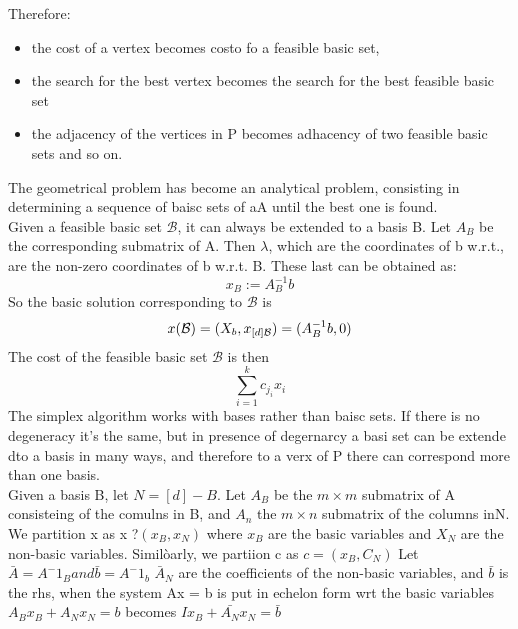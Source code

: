 Therefore:
\begin{itemize}
    \item the cost of a vertex becomes costo fo a feasible basic set,
    \item the search for the best vertex becomes the search for the best feasible basic set
    \item the adjacency of the vertices in P becomes adhacency of two feasible basic sets and so on. 
\end{itemize}
The geometrical problem has become an analytical problem, consisting in determining a sequence of baisc sets of aA until the best one is found.\\
Given a feasible basic set $ \mathcal{B} $, it can always be extended to a basis B. Let $A_B$ be the corresponding submatrix of A. Then $\lambda$, which are the coordinates of b w.r.t., are the non-zero coordinates of b w.r.t. B. These last can be obtained as: \[ 
    x_B := A_B^{-1}b 
\]
So the basic solution corresponding to $ \mathcal{B } $ is 
\[ 
    x(\mathcal{B}) = (X_b, x_{[d]\\ \mathcal{B}}) = (A^{-1}_Bb,0)
\]
The cost of the feasible basic set $ \mathcal{B} $ is then \[ 
    \sum_{i=1}^{k}{c_{j_i}x_i} 
\]
The simplex algorithm works with bases rather than baisc sets. If there is no degeneracy it's the same, but in presence of degernarcy a basi set can be extende dto a basis in many ways, and therefore to a verx of P there can correspond more than one basis.\\
Given a basis B, let $N=[d] -B$. Let $A_B$  be the $m\times m$ submatrix of A consisteing of the comulns in B, and $A_n$ the $m\times n$ submatrix of the columns inN. We partition x as x ?$(x_B, x_N)$ where $x_B$ are the basic variables and $X_N$ are the non-basic variables. Similòarly, we partiion c as $c=(x_B,C_N)$
Let $\bar{A} = A^-1_B and \bar b = A^-1_b$
$\bar{A}_N$ are the coefficients of the non-basic variables, and $\bar{b}$ is the rhs, when the system Ax = b is put in echelon form wrt the basic variables
$A_Bx_B + A_Nx_N = b$ becomes $Ix_B+\bar{A_N}x_N = \bar{b}$
